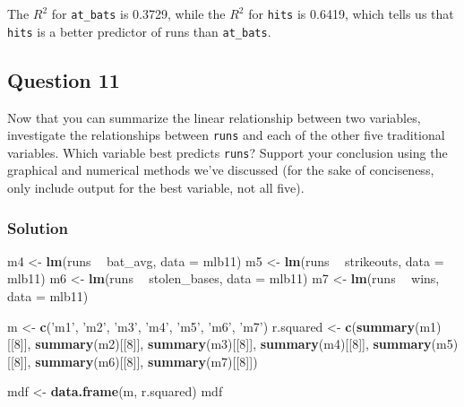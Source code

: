 \documentclass[]{article}
\newenvironment{Shaded}{\begin{snugshade}}{\end{snugshade}}
\newcommand{\KeywordTok}[1]{\textcolor[rgb]{0.13,0.29,0.53}{\textbf{#1}}}
\newcommand{\DataTypeTok}[1]{\textcolor[rgb]{0.13,0.29,0.53}{#1}}
\newcommand{\DecValTok}[1]{\textcolor[rgb]{0.00,0.00,0.81}{#1}}
\newcommand{\StringTok}[1]{\textcolor[rgb]{0.31,0.60,0.02}{#1}}
\newcommand{\OperatorTok}[1]{\textcolor[rgb]{0.81,0.36,0.00}{\textbf{#1}}}
\newcommand{\NormalTok}[1]{#1}
\begin{document}
The \(R^2\) for \texttt{at\_bats} is 0.3729, while the \(R^2\) for
\texttt{hits} is 0.6419, which tells us that \texttt{hits} is a better
predictor of runs than \texttt{at\_bats}.

\subsection{Question 11}\label{question-11}

Now that you can summarize the linear relationship between two
variables, investigate the relationships between \texttt{runs} and each
of the other five traditional variables. Which variable best predicts
\texttt{runs}? Support your conclusion using the graphical and numerical
methods we've discussed (for the sake of conciseness, only include
output for the best variable, not all five).

\subsubsection{Solution}\label{solution-10}

\begin{Shaded}
\begin{Highlighting}[]
\NormalTok{m4 <-}\StringTok{ }\KeywordTok{lm}\NormalTok{(runs }\OperatorTok{~}\StringTok{ }\NormalTok{bat_avg, }\DataTypeTok{data =}\NormalTok{ mlb11)}
\NormalTok{m5 <-}\StringTok{ }\KeywordTok{lm}\NormalTok{(runs }\OperatorTok{~}\StringTok{ }\NormalTok{strikeouts, }\DataTypeTok{data =}\NormalTok{ mlb11)}
\NormalTok{m6 <-}\StringTok{ }\KeywordTok{lm}\NormalTok{(runs }\OperatorTok{~}\StringTok{ }\NormalTok{stolen_bases, }\DataTypeTok{data =}\NormalTok{ mlb11)}
\NormalTok{m7 <-}\StringTok{ }\KeywordTok{lm}\NormalTok{(runs }\OperatorTok{~}\StringTok{ }\NormalTok{wins, }\DataTypeTok{data =}\NormalTok{ mlb11)}

\NormalTok{m <-}\StringTok{ }\KeywordTok{c}\NormalTok{(}\StringTok{'m1'}\NormalTok{, }\StringTok{'m2'}\NormalTok{, }\StringTok{'m3'}\NormalTok{, }\StringTok{'m4'}\NormalTok{, }\StringTok{'m5'}\NormalTok{, }\StringTok{'m6'}\NormalTok{, }\StringTok{'m7'}\NormalTok{)}
\NormalTok{r.squared <-}\StringTok{ }\KeywordTok{c}\NormalTok{(}\KeywordTok{summary}\NormalTok{(m1)[[}\DecValTok{8}\NormalTok{]], }\KeywordTok{summary}\NormalTok{(m2)[[}\DecValTok{8}\NormalTok{]], }\KeywordTok{summary}\NormalTok{(m3)[[}\DecValTok{8}\NormalTok{]], }\KeywordTok{summary}\NormalTok{(m4)[[}\DecValTok{8}\NormalTok{]], }\KeywordTok{summary}\NormalTok{(m5)[[}\DecValTok{8}\NormalTok{]], }\KeywordTok{summary}\NormalTok{(m6)[[}\DecValTok{8}\NormalTok{]], }\KeywordTok{summary}\NormalTok{(m7)[[}\DecValTok{8}\NormalTok{]])}

\NormalTok{mdf <-}\StringTok{ }\KeywordTok{data.frame}\NormalTok{(m, r.squared)}
\NormalTok{mdf}
\end{Highlighting}
\end{Shaded}
\end{document}
